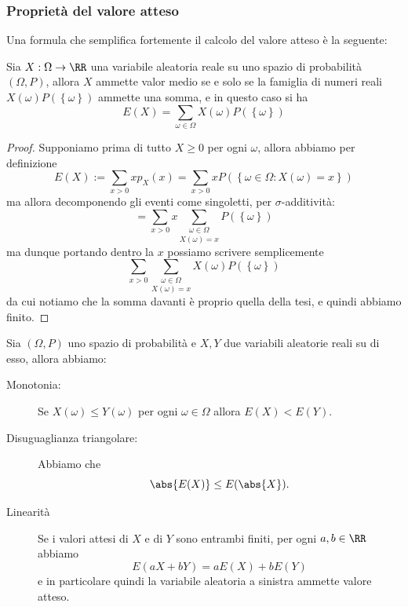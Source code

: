 \documentclass[11pt]{scrartcl}
\begin{document}
	\subsubsection{Proprietà del valore atteso}
	
	Una formula che semplifica fortemente il calcolo del valore atteso è la seguente:
	\begin{proposition}
		Sia $X:\Omega\to\RR$ una variabile aleatoria reale su uno spazio di probabilità $(\Omega,P)$, allora $X$ ammette valor medio se e solo se la famiglia di numeri reali $X(\omega)P(\left\{\omega\right\})$ ammette una somma, e in questo caso si ha
		$$E(X)=\sum_{\omega\in\Omega}X(\omega)P(\left\{\omega\right\})$$
	\end{proposition}
	\begin{proof}
		Supponiamo prima di tutto $X\ge 0$ per ogni $\omega$, allora abbiamo per definizione
		$$E(X):=\sum_{x>0}xp_X(x)=\sum_{x>0}xP\left(\left\{\omega\in\Omega:X(\omega)=x\right\}\right)$$
		ma allora decomponendo gli eventi come singoletti, per $\sigma$-additività:
		$$=\sum_{x>0}x\underset{X(\omega)=x}{\sum_{\omega\in\Omega}}P(\left\{\omega\right\})$$
		ma dunque portando dentro la $x$ possiamo scrivere semplicemente
		$$\sum_{x>0}\underset{X(\omega)=x}{\sum_{\omega\in\Omega}}X(\omega)P(\left\{\omega\right\})$$
		da cui notiamo che la somma davanti è proprio quella della tesi, e quindi abbiamo finito. 
	\end{proof}
	\begin{proposition}
		Sia $(\Omega,P)$ uno spazio di probabilità e $X,Y$ due variabili aleatorie reali su di esso, allora abbiamo:
		\begin{description}
			\item[Monotonia:] Se $X(\omega)\le Y(\omega)$ per ogni $\omega\in\Omega$ allora $E(X)<E(Y)$.
			\item[Disuguaglianza triangolare:] Abbiamo che
			$$\abs{E(X)}\le E(\abs{X}).$$
			\item[Linearità] Se i valori attesi di $X$ e di $Y$ sono entrambi finiti, per ogni $a,b\in\RR$ abbiamo 
			$$E(aX+bY)=aE(X)+bE(Y)$$
			e in particolare quindi la variabile aleatoria a sinistra ammette valore atteso.
		\end{description}
	\end{proposition}
\end{document}
